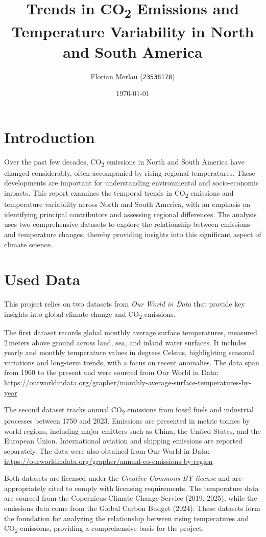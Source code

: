 \documentclass[a4paper,11pt]{article}
\title{Trends in CO\textsubscript{2} Emissions and Temperature Variability in North and South America}
\author{Florian Merlau (\texttt{23538178})}
\date{\today}
\begin{document}
\maketitle

\section{Introduction}
Over the past few decades, CO\textsubscript{2} emissions in North and South America have changed considerably, often accompanied by rising regional temperatures. These developments are important for understanding environmental and socio-economic impacts. This report examines the temporal trends in CO\textsubscript{2} emissions and temperature variability across North and South America, with an emphasis on identifying principal contributors and assessing regional differences. The analysis uses two comprehensive datasets to explore the relationship between emissions and temperature changes, thereby providing insights into this significant aspect of climate science. 

\section{Used Data}
This project relies on two datasets from \textit{Our World in Data} that provide key insights into global climate change and CO\textsubscript{2} emissions.

\noindent
The first dataset records global monthly average surface temperatures, measured 2\,meters above ground across land, sea, and inland water surfaces. It includes yearly and monthly temperature values in degrees Celsius, highlighting seasonal variations and long-term trends, with a focus on recent anomalies. The data span from 1960 to the present and were sourced from Our World in Data:  
\url{https://ourworldindata.org/grapher/monthly-average-surface-temperatures-by-year}

\noindent
The second dataset tracks annual CO\textsubscript{2} emissions from fossil fuels and industrial processes between 1750 and 2023. Emissions are presented in metric tonnes by world regions, including major emitters such as China, the United States, and the European Union. International aviation and shipping emissions are reported separately. The data were also obtained from Our World in Data:  
\url{https://ourworldindata.org/grapher/annual-co-emissions-by-region}

\noindent
Both datasets are licensed under the \textit{Creative Commons BY license} and are appropriately cited to comply with licensing requirements. The temperature data are sourced from the Copernicus Climate Change Service (2019, 2025), while the emissions data come from the Global Carbon Budget (2024). These datasets form the foundation for analyzing the relationship between rising temperatures and CO\textsubscript{2} emissions, providing a comprehensive basis for the project.
\end{document}
